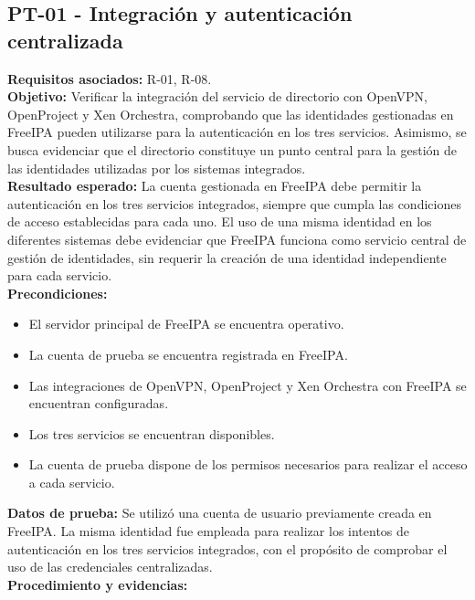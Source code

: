 \subsection{PT-01 - Integración y autenticación centralizada}\label{subsec:pt01}
\textbf{Requisitos asociados:} R-01, R-08.\\
\textbf{Objetivo:} Verificar la integración del servicio de directorio con OpenVPN, OpenProject y Xen Orchestra, comprobando que las identidades gestionadas en FreeIPA pueden utilizarse para la autenticación en los tres servicios. Asimismo, se busca evidenciar que el directorio constituye un punto central para la gestión de las identidades utilizadas por los sistemas integrados.\\
\textbf{Resultado esperado:} La cuenta gestionada en FreeIPA debe permitir la autenticación en los tres servicios integrados, siempre que cumpla las condiciones de acceso establecidas para cada uno. El uso de una misma identidad en los diferentes sistemas debe evidenciar que FreeIPA funciona como servicio central de gestión de identidades, sin requerir la creación de una identidad independiente para cada servicio.\\
\textbf{Precondiciones:}
\begin{itemize}
	\item El servidor principal de FreeIPA se encuentra operativo.
	\item La cuenta de prueba se encuentra registrada en FreeIPA.
	\item Las integraciones de OpenVPN, OpenProject y Xen Orchestra con FreeIPA se encuentran configuradas.
	\item Los tres servicios se encuentran disponibles.
	\item La cuenta de prueba dispone de los permisos necesarios para realizar el acceso a cada servicio.
\end{itemize}
\textbf{Datos de prueba:} Se utilizó una cuenta de usuario previamente creada en FreeIPA. La misma identidad fue empleada para realizar los intentos de autenticación en los tres servicios integrados, con el propósito de comprobar el uso de las credenciales centralizadas.\\
\textbf{Procedimiento y evidencias:}
